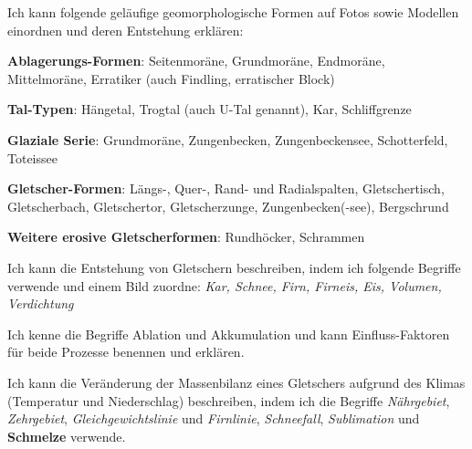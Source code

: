 \begin{todolist}
\item Ich kann folgende geläufige geomorphologische Formen auf Fotos sowie Modellen einordnen und deren Entstehung erklären:
\begin{todolist}
\item \textbf{Ablagerungs-Formen}: Seitenmoräne, Grundmoräne, Endmoräne, Mittelmoräne, Erratiker (auch Findling, erratischer Block)
\item \textbf{Tal-Typen}: Hängetal, Trogtal (auch U-Tal genannt), Kar, Schliffgrenze
\item \textbf{Glaziale Serie}: Grundmoräne, Zungenbecken, Zungenbeckensee, Schotterfeld, Toteissee
\item \textbf{Gletscher-Formen}: Längs-, Quer-, Rand- und Radialspalten, Gletschertisch, Gletscherbach, Gletschertor, Gletscherzunge, Zungenbecken(-see), Bergschrund
\item \textbf{Weitere erosive Gletscherformen}: Rundhöcker, Schrammen
\end{todolist}
\item Ich kann die Entstehung von Gletschern beschreiben, indem ich folgende Begriffe verwende und einem Bild zuordne: \textit{Kar, Schnee, Firn, Firneis, Eis, Volumen, Verdichtung}
\item Ich kenne die Begriffe Ablation und Akkumulation und kann Einfluss-Faktoren für beide Prozesse benennen und erklären.
\item Ich kann die Veränderung der Massenbilanz eines Gletschers aufgrund des Klimas (Temperatur und Niederschlag) beschreiben, indem ich die Begriffe \textit{Nährgebiet}, \textit{Zehrgebiet}, \textit{Gleichgewichtslinie} und \textit{Firnlinie}, \textit{Schneefall}, \textit{Sublimation} und \textbf{Schmelze} verwende.
\end{todolist}

